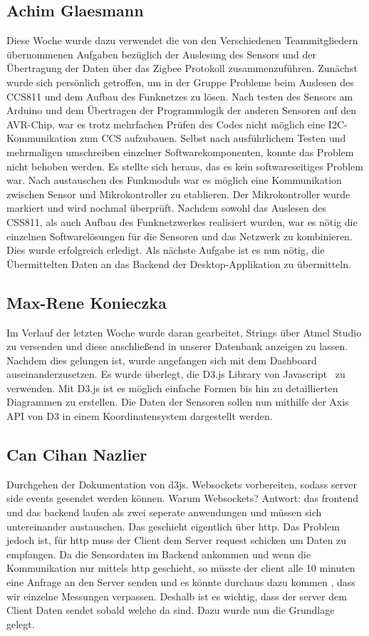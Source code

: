 \documentclass[]{article}
\begin{document}
\subsection{Achim Glaesmann}
Diese Woche wurde dazu verwendet die von den Verschiedenen Teammitgliedern übernommenen Aufgaben bezüglich der Auslesung des Sensors und der Übertragung der Daten über das Zigbee Protokoll zusammenzuführen. Zunächst wurde sich persönlich getroffen, um in der Gruppe Probleme beim Auslesen des CCS811 und dem Aufbau des Funknetzes zu lösen. Nach testen des Sensors am Arduino und dem Übertragen der Programmlogik der anderen Sensoren auf den AVR-Chip, war es trotz mehrfachen Prüfen des Codes nicht möglich eine I2C-Kommunikation zum CCS aufzubauen. Selbst nach ausführlichem Testen und mehrmaligen umschreiben einzelner Softwarekomponenten, konnte das Problem nicht behoben werden. Es stellte sich heraus, das es kein softwareseitiges Problem war. Nach austauschen des Funkmoduls war es möglich eine Kommunikation zwischen Sensor und Mikrokontroller zu etablieren. Der Mikrokontroller wurde markiert und wird nochmal überprüft. Nachdem sowohl das Auslesen des CSS811, als auch Aufbau des Funknetzwerkes realisiert wurden, war es nötig die einzelnen Softwarelösungen für die Sensoren und das Netzwerk zu kombinieren. Dies wurde erfolgreich erledigt. Als nächste Aufgabe ist es nun nötig, die Übermittelten Daten an das Backend der Desktop-Applikation zu übermitteln.

\subsection{Max-Rene Konieczka}
Im Verlauf der letzten Woche wurde daran gearbeitet, Strings über Atmel Studio zu versenden und diese anschließend in unserer Datenbank anzeigen zu lassen. Nachdem dies gelungen ist, wurde angefangen sich mit dem Dashboard auseinanderzusetzen. Es wurde überlegt, die D3.js Library von Javascript~\cite{D3JS} zu verwenden. Mit D3.js ist es möglich einfache Formen bis hin zu detaillierten Diagrammen zu erstellen.
Die Daten der Sensoren sollen nun mithilfe der Axis API von D3 in einem Koordinatensystem dargestellt werden. 
\subsection{Can Cihan Nazlier}
Durchgehen der Dokumentation von d3js. Websockets vorbereiten, sodass server side events gesendet werden können. Warum Websockets?
Antwort: das frontend und das backend laufen als zwei seperate anwendungen und müssen sich untereinander austauschen. Das geschieht eigentlich über http. Das Problem jedoch ist,
für http muss der Client dem Server request schicken um Daten zu empfangen. Da die Sensordaten im Backend ankommen und wenn die Kommunikation nur mittels http geschieht, so müsste der client alle 10 minuten eine Anfrage an den Server senden und es könnte durchaus dazu kommen , dass wir einzelne Messungen verpassen. Deshalb ist es wichtig, dass der server dem Client Daten sendet sobald welche da sind. Dazu wurde nun die Grundlage gelegt. 


\printbibliography
\end{document}
